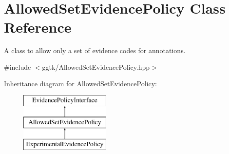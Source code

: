 \hypertarget{classAllowedSetEvidencePolicy}{}\section{Allowed\+Set\+Evidence\+Policy Class Reference}
\label{classAllowedSetEvidencePolicy}


A class to allow only a set of evidence codes for annotations.  




{\ttfamily \#include $<$ggtk/\+Allowed\+Set\+Evidence\+Policy.\+hpp$>$}

Inheritance diagram for Allowed\+Set\+Evidence\+Policy\+:\begin{figure}[H]
\begin{center}
\leavevmode
\includegraphics[height=3.000000cm]{classAllowedSetEvidencePolicy}
\end{center}
\end{figure}
